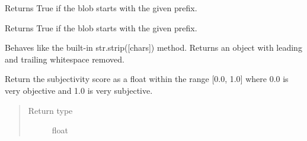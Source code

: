 \documentclass[letterpaper,10pt,english]{sphinxmanual}
\begin{document}
\begin{fulllineitems}
\begin{fulllineitems}
\begin{quote}
\begin{description}
\end{description}\end{quote}

\end{fulllineitems}


\begin{fulllineitems}
\label{api_reference:textblob_de.blob.BaseBlob.starts_with}
Returns True if the blob starts with the given prefix.

\end{fulllineitems}


\begin{fulllineitems}
\label{api_reference:textblob_de.blob.BaseBlob.startswith}
Returns True if the blob starts with the given prefix.

\end{fulllineitems}


\begin{fulllineitems}
\label{api_reference:textblob_de.blob.BaseBlob.strip}
Behaves like the built-in str.strip({[}chars{]}) method. Returns
an object with leading and trailing whitespace removed.

\end{fulllineitems}


\begin{fulllineitems}
\label{api_reference:textblob_de.blob.BaseBlob.subjectivity}
Return the subjectivity score as a float within the range {[}0.0, 1.0{]}
where 0.0 is very objective and 1.0 is very subjective.
\begin{quote}\begin{description}
\item[{Return type}] \leavevmode
float

\end{description}\end{quote}


\end{fulllineitems}
\end{fulllineitems}
\end{document}
